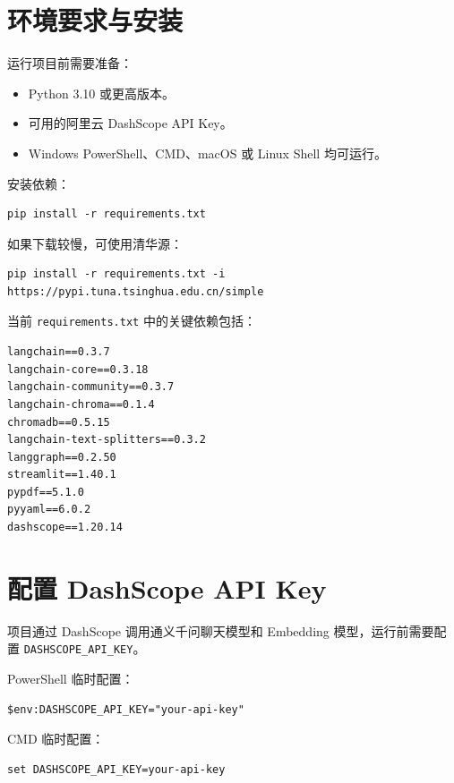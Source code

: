 \documentclass[UTF8,zihao=-4]{ctexart}
\begin{document}
\section{环境要求与安装}

运行项目前需要准备：

\begin{itemize}
\item Python 3.10 或更高版本。
\item 可用的阿里云 DashScope API Key。
\item Windows PowerShell、CMD、macOS 或 Linux Shell 均可运行。
\end{itemize}

安装依赖：

\begin{Verbatim}[breaklines=true,breakanywhere=true,fontsize=\small]
pip install -r requirements.txt
\end{Verbatim}

如果下载较慢，可使用清华源：

\begin{Verbatim}[breaklines=true,breakanywhere=true,fontsize=\small]
pip install -r requirements.txt -i https://pypi.tuna.tsinghua.edu.cn/simple
\end{Verbatim}

当前 \texttt{requirements.txt} 中的关键依赖包括：

\begin{Verbatim}[breaklines=true,breakanywhere=true,fontsize=\small]
langchain==0.3.7
langchain-core==0.3.18
langchain-community==0.3.7
langchain-chroma==0.1.4
chromadb==0.5.15
langchain-text-splitters==0.3.2
langgraph==0.2.50
streamlit==1.40.1
pypdf==5.1.0
pyyaml==6.0.2
dashscope==1.20.14
\end{Verbatim}

\section{配置 DashScope API Key}

项目通过 DashScope 调用通义千问聊天模型和 Embedding 模型，运行前需要配置 \texttt{DASHSCOPE\_API\_KEY}。

PowerShell 临时配置：

\begin{Verbatim}[breaklines=true,breakanywhere=true,fontsize=\small]
$env:DASHSCOPE_API_KEY="your-api-key"
\end{Verbatim}

CMD 临时配置：

\begin{Verbatim}[breaklines=true,breakanywhere=true,fontsize=\small]
set DASHSCOPE_API_KEY=your-api-key
\end{Verbatim}
\end{document}
